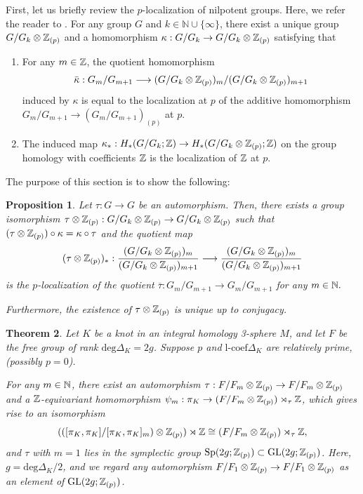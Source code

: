 \documentclass{article}
\theoremstyle{plain}
\newtheorem{thm}{Theorem}[section]
\newtheorem{prop}[thm]{Proposition}
\theoremstyle{definition}
\newcommand{\lra}{\longrightarrow}
\newcommand{\ra}{\rightarrow}
\newcommand{\N}{{\Bbb N}}
\newcommand{\Z}{{\Bbb Z}}
\newcommand{\Sp}{{\rm Sp}}
\newcommand{\GL}{{\rm GL}}
\newcommand{\lc}{{\mathrm{l}\textrm{-}\mathrm{coef}}}
\begin{document}
{First, let us briefly review the $p$-localization of nilpotent groups. Here, we refer the reader to \cite{Rag}. For any group $G$ and $k \in \mathbb{N} \cup \{ \infty\} $, there exist a unique group $G/G_k \otimes \Z_{(p)}$ and a homomorphism $\kappa: G/G_k \ra G/G_k \otimes \Z_{(p)}$ satisfying that
\begin{enumerate}[(R1)]
\item For any $m \in \Z$, the quotient homomorphism 
\[\bar{ \kappa} :G_m/G_{m+1} \lra ( G/G_k \otimes \Z_{(p)})_m / ( G/G_k \otimes \Z_{(p)})_{m+1} \]
induced by $\kappa$ is equal to the localization at $p$ of the additive homomorphism $G_m/G_{m+1} \ra (G_m/G_{m+1})_{(p)}$ at $p$.
\item The induced map $\kappa_* : H_*(G/G_k ; \Z) \ra H_*(G/G_k \otimes \Z_{(p)} ;\Z )$ on the group homology with coefficients $\Z$ is the localization of $\Z$ at $p$.
\end{enumerate}

The purpose of this section is to show the following:
\begin{prop}\label{bb127}
Let $\tau: G \ra G$ be an automorphism. Then, there exists a group isomorphism $\tau\otimes \Z_{(p)} : G/G_k \otimes \Z_{(p)} \ra G/G_k \otimes \Z_{(p)} $ such that $(\tau\otimes \Z_{(p)}) \circ \kappa = \kappa \circ \tau$ and the quotient map
\[(\tau\otimes \Z_{(p)})_* : \frac{(G/G_k \otimes \Z_{(p)})_m }{( G/G_k \otimes \Z_{(p)})_{m+1}} \lra \frac{(G/G_k \otimes \Z_{(p)})_m }{( G/G_k \otimes \Z_{(p)})_{m+1}} \]
is the $p$-localization of the quotient $ \overline{\tau} : G_m/ G_{m+1} \ra G_m/ G_{m+1} $ for any $m \in \N.$

Furthermore, the existence of $\tau\otimes \Z_{(p)} $ is unique up to conjugacy.
\end{prop}

\begin{thm}\label{bb1279}
Let $K$ be a knot in an integral homology 3-sphere $M$, and let $F$ be the free group of rank $ \mathrm{deg} \Delta_K = 2g$. Suppose $p$ and $\lc \Delta_K$ are relatively prime, (possibly $p=0$). %

 For any $m \in \N $, there exist an automorphism $\tau : F/F_m \otimes \Z_{(p)} \ra F /F_m \otimes \Z_{(p)}$ and a $\Z$-equivariant homomorphism $\psi_m : \pi_K \ra (F /F_m \otimes \Z_{(p)} )\rtimes_{\tau} \Z $, which gives rise to an isomorphism
\begin{equation}\label{slsl} ( ([\pi_K ,\pi_K ] /[\pi_K ,\pi_K ]_m) \otimes \Z_{(p)}) \rtimes \Z \cong ( F /F_m \otimes \Z_{(p)}) \rtimes_{\tau } \Z, \end{equation}
and $ \tau$ with $m=1$ lies in the symplectic group $ \Sp(2g;\Z_{(p)})\subset \GL(2g;\Z_{(p)})$. Here, $g= \mathrm{deg}\Delta_K/2$, and we regard any automorphism $ F/F_1 \otimes \Z_{(p)} \ra F /F_1 \otimes \Z_{(p)}$ as an element of $\GL(2g;\Z_{(p)})$.


\end{thm}}
\end{document}
